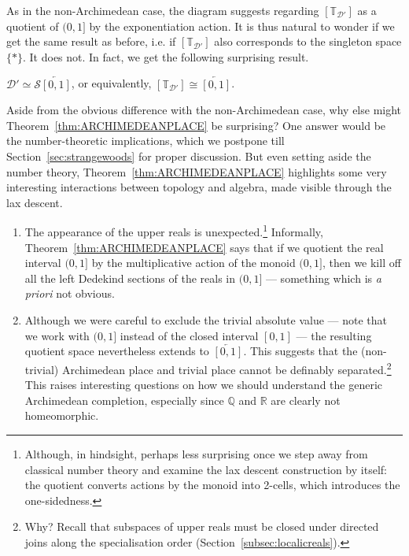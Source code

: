 \documentclass[a4paper, 11pt,reqno]{amsart}
\newcommand{\baseS}{\mathcal{S}}
\newcommand{\thT}{\mathbb{T}}
\newcommand{\D}{\mathcal{D}}
\begin{document}
As in the non-Archimedean case, the diagram suggests regarding $[\thT_{\D'}]$ as a quotient of $(0,1]$ by the exponentiation action. It is thus natural to wonder if we get the same result as before, i.e. if $[\thT_{\D'}]$ also corresponds to the singleton space $\{*\}$. It does not. In fact, we get the following surprising result.

\begin{theorem:ARCHPRIME} $\D'\simeq\baseS\overleftarrow{[0,1]}$, or equivalently, $[\thT_{\D'}]\cong\overleftarrow{[0,1]}$.
\end{theorem:ARCHPRIME}


Aside from the obvious difference with the non-Archimedean case, why else might Theorem~\ref{thm:ARCHIMEDEANPLACE} be surprising? One answer would be the number-theoretic implications, which we postpone till Section~\ref{sec:strangewoods} for proper discussion. But even setting aside the number theory, Theorem~\ref{thm:ARCHIMEDEANPLACE} highlights some very interesting interactions between topology and algebra, made visible through the lax descent.



\begin{enumerate}[label=(\alph*)]
	\item The appearance of the upper reals is unexpected.\footnote{Although, in hindsight, perhaps less surprising once we step away from classical number theory and examine the lax descent construction by itself: the quotient converts actions by the monoid into 2-cells, which introduces the one-sidedness.} Informally, Theorem~\ref{thm:ARCHIMEDEANPLACE} says that if we quotient the real interval $(0,1]$ by the multiplicative action of the monoid $(0,1]$, then we kill off all the left Dedekind sections of the reals in $(0,1]$ --- something which is \textit{a priori} not obvious.%
	\item Although we were careful to exclude the trivial absolute value --- note that we work with $(0,1]$ instead of the closed interval $[0,1]$ --- the resulting quotient space nevertheless extends to $\overleftarrow{[0,1]}$. This suggests that the (non-trivial) Archimedean place and trivial place cannot be definably separated.\footnote{Why? Recall that subspaces of upper reals must be closed under directed joins along the specialisation order (Section~\ref{subsec:localicreals}).} This raises interesting questions on how we should understand the generic Archimedean completion, especially since $\mathbb{Q}$ and $\mathbb{R}$ are clearly not homeomorphic.
\end{enumerate}
\end{document}
